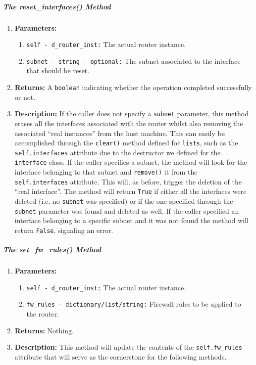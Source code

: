         \subparagraph{The reset\_interfaces() Method}
            \begin{enumerate}
                \item \textbf{Parameters:}
                \begin{enumerate}
                    \item \texttt{self - d\_router\_inst:} The actual router instance.
                    \item \texttt{subnet - string - optional:} The subnet associated to the interface that should be reset.
                \end{enumerate}
                \item \textbf{Returns:} A \texttt{boolean} indicating whether the operation completed successfully or not.
                \item \textbf{Description:} If the caller does not specify a \texttt{subnet} parameter, this method erases all the interfaces associated with the router whilst also removing the associated ``real instances'' from the host machine. This can easily be accomplished through the \texttt{clear()} \cite{bib:python-datastructures} method defined for \texttt{lists}, such as the \texttt{self.interfaces} attribute due to the destructor we defined for the \texttt{interface} class. If the caller specifies a subnet, the method will look for the interface belonging to that subnet and \texttt{remove()} it from the \texttt{self.interfaces} attribute. This will, as before, trigger the deletion of the ``real interface''. The method will return \texttt{True} if either all the interfaces were deleted (i.e. no \texttt{subnet} was specified) or if the one specified through the \texttt{subnet} parameter was found and deleted as well. If the caller specified an interface belonging to a specific subnet and it was not found the method will return \texttt{False}, signaling an error.
            \end{enumerate}

        \subparagraph{The set\_fw\_rules() Method}
            \begin{enumerate}
                \item \textbf{Parameters:}
                \begin{enumerate}
                    \item \texttt{self - d\_router\_inst:} The actual router instance.
                    \item \texttt{fw\_rules - dictionary/list/string:} Firewall rules to be applied to the router.
                \end{enumerate}
                \item \textbf{Returns:} Nothing.
                \item \textbf{Description:} This method will update the contents of the \texttt{self.fw\_rules} attribute that will serve as the cornerstone for the following methods.
            \end{enumerate}

